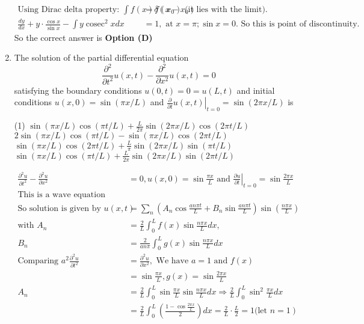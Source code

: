\begin{enumerate}[label=\color{ocre}\textbf{\arabic*.}]
\begin{answer}
\begin{align*}
	\text{Using Dirac delta property: }\int f(x) \delta\left(x-x_{0}\right)&=f\left(x_{0}\right)\text{ (it lies with the limit).}\\
	\frac{d y}{d x}+y \cdot \frac{\cos x}{\sin x}-\int y \operatorname{cosec}^{2} x d x&=1,\text{ at }x=\pi ; \sin x=0 .\text{ So this is point of discontinuity.}
	\end{align*}
	So the correct answer is \textbf{Option (D)}
\end{answer}
\item The solution of the partial differential equation
$$
\frac{\partial^{2}}{\partial t^{2}} u(x, t)-\frac{\partial^{2}}{\partial x^{2}} u(x, t)=0
$$
satisfying the boundary conditions $u(0, t)=0=u(L, t)$ and initial conditions $u(x, 0)=\sin (\pi x / L)$ and $\left.\frac{\partial}{\partial t} u(x, t)\right|_{t=0}=\sin (2 \pi x / L)$ is
{}
	\begin{tasks}(1)
		\task[\textbf{A.}] $\sin (\pi x / L) \cos (\pi t / L)+\frac{L}{2 \pi} \sin (2 \pi x / L) \cos (2 \pi t / L)$
		\task[\textbf{B.}] $2 \sin (\pi x / L) \cos (\pi t / L)-\sin (\pi x / L) \cos (2 \pi t / L)$
		\task[\textbf{C.}] $\sin (\pi x / L) \cos (2 \pi t / L)+\frac{L}{\pi} \sin (2 \pi x / L) \sin (\pi t / L)$
		\task[\textbf{D.}] $\sin (\pi x / L) \cos (\pi t / L)+\frac{L}{2 \pi} \sin (2 \pi x / L) \sin (2 \pi t / L)$
	\end{tasks}
	\begin{answer}
		\begin{align*}
		\frac{\partial^{2} u}{\partial t^{2}}-\frac{\partial^{2} u}{\partial x^{2}}&=0, u(x, 0)=\sin \frac{\pi x}{L}\text{ and }\left.\frac{\partial u}{\partial t}\right|_{t=0}=\sin \frac{2 \pi x}{L}\\
		\text{This is a wave equation}\\
		\text{So solution is given by }u(x, t)&=\sum_{n}\left(A_{n} \cos \frac{a n \pi t}{L}+B_{n} \sin \frac{a n \pi t}{L}\right) \sin \left(\frac{n \pi x}{L}\right)\\
		\text{with }A_{n}&=\frac{2}{L} \int_{0}^{L} f(x) \sin \frac{n \pi x}{L} d x, \\ B_{n}&=\frac{2}{a n \pi} \int_{0}^{L} g(x) \sin \frac{n \pi x}{L} d x\\
		\text{Comparing }a^{2} \frac{\partial^{2} u}{\partial t^{2}}&=\frac{\partial^{2} u}{\partial x^{2}},\text{ We have }a=1\text{ and }f(x)\\&=\sin \frac{\pi x}{L}, g(x)=\sin \frac{2 \pi x}{L}\\
		A_{n}&=\frac{2}{L} \int_{0}^{L} \sin \frac{\pi x}{L} \sin \frac{n \pi x}{L} d x \Rightarrow \frac{2}{L} \int_{0}^{L} \sin ^{2} \frac{\pi x}{L} d x\\&=\frac{2}{L} \int_{0}^{L}\left(\frac{1-\cos \frac{2 \pi x}{L}}{2}\right) d x=\frac{2}{L} \cdot \frac{L}{2}=1 (\text{let }\left.n=1\right)\\

\end{align*}
\end{answer}
\end{enumerate}
